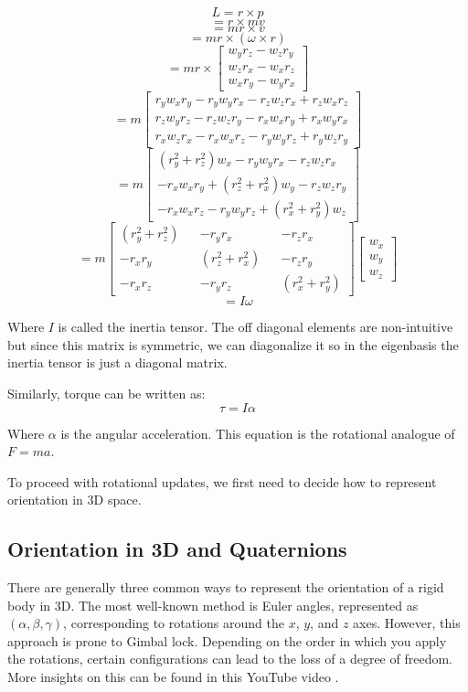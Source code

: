 \[
L = r \times p
\]
\[ 
= r \times mv
\]
\[ 
= mr \times v
\]
\[ 
= mr \times (\omega \times r)
\]
\[ 
= mr \times 
\begin{bmatrix}
    w_yr_z - w_zr_y \\
    w_zr_x - w_xr_z \\
    w_xr_y - w_yr_x  
\end{bmatrix}
\]
\[
= m
\begin{bmatrix}
    r_yw_xr_y - r_yw_yr_x - r_zw_zr_x + r_zw_xr_z \\
    r_zw_yr_z - r_zw_zr_y - r_xw_xr_y + r_xw_yr_x \\
    r_xw_zr_x - r_xw_xr_z - r_yw_yr_z + r_yw_zr_y
\end{bmatrix}
\]
\[
= m
\begin{bmatrix}
    (r_y^2 + r_z^2)w_x - r_yw_yr_x - r_zw_zr_x\\
    -r_xw_xr_y + (r_z^2 + r_x^2)w_y - r_zw_zr_y \\
    -r_xw_xr_z - r_yw_yr_z + (r_x^2 + r_y^2)w_z
\end{bmatrix}
\]
\[
= m
\begin{bmatrix}
    (r_y^2 + r_z^2) && -r_yr_x && -r_zr_x\\
    -r_xr_y && (r_z^2 + r_x^2) && -r_zr_y \\
    -r_xr_z && -r_yr_z && (r_x^2 + r_y^2)
\end{bmatrix}
\begin{bmatrix}
    w_x\\
    w_y\\
    w_z
\end{bmatrix}
\]
\[
= I\omega
\]

Where $I$ is called the inertia tensor. The off diagonal elements are non-intuitive but since this matrix is symmetric, we can diagonalize it so in the eigenbasis the inertia tensor is just a diagonal matrix.

Similarly, torque can be written as:
\[ 
\tau = I\alpha
\]

Where $\alpha$ is the angular acceleration. This equation is the rotational analogue of $F=ma$.

To proceed with rotational updates, we first need to decide how to represent orientation in 3D space.

\subsection{Orientation in 3D and Quaternions}
There are generally three common ways to represent the orientation of a rigid body in 3D. The most well-known method is Euler angles, represented as $(\alpha, \beta, \gamma)$, corresponding to rotations around the $x$, $y$, and $z$ axes. However, this approach is prone to Gimbal lock. Depending on the order in which you apply the rotations, certain configurations can lead to the loss of a degree of freedom. More insights on this can be found in this YouTube video \cite{gimble_video}.

